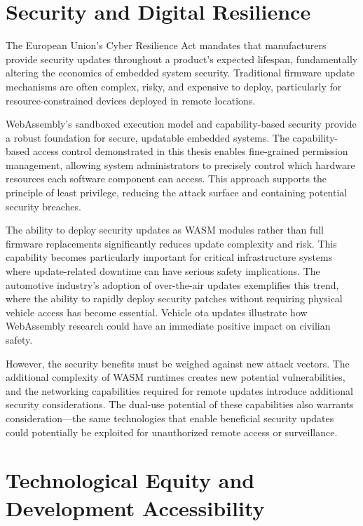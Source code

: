 \section*{Security and Digital Resilience}

The European Union's Cyber Resilience Act mandates that manufacturers provide security updates throughout a product's expected lifespan, fundamentally altering the economics of embedded system security. Traditional firmware update mechanisms are often complex, risky, and expensive to deploy, particularly for resource-constrained devices deployed in remote locations.

WebAssembly's sandboxed execution model and capability-based security provide a robust foundation for secure, updatable embedded systems. The capability-based access control demonstrated in this thesis enables fine-grained permission management, allowing system administrators to precisely control which hardware resources each software component can access. This approach supports the principle of least privilege, reducing the attack surface and containing potential security breaches.

The ability to deploy security updates as WASM modules rather than full firmware replacements significantly reduces update complexity and risk. This capability becomes particularly important for critical infrastructure systems where update-related downtime can have serious safety implications. The automotive industry's adoption of over-the-air updates exemplifies this trend, where the ability to rapidly deploy security patches without requiring physical vehicle access has become essential. Vehicle \acrshort{ota} updates illustrate how WebAssembly research could have an immediate positive impact on civilian safety.

However, the security benefits must be weighed against new attack vectors. The additional complexity of WASM runtimes creates new potential vulnerabilities, and the networking capabilities required for remote updates introduce additional security considerations. The dual-use potential of these capabilities also warrants consideration—the same technologies that enable beneficial security updates could potentially be exploited for unauthorized remote access or surveillance.

\section*{Technological Equity and Development Accessibility}

